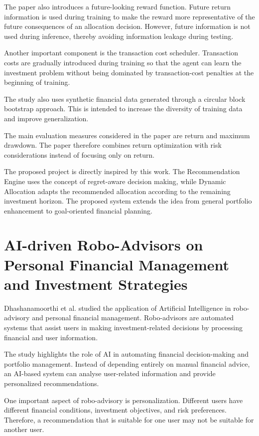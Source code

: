 The paper also introduces a future-looking reward function. Future return information is used during training to make the reward more representative of the future consequences of an allocation decision. However, future information is not used during inference, thereby avoiding information leakage during testing.

Another important component is the transaction cost scheduler. Transaction costs are gradually introduced during training so that the agent can learn the investment problem without being dominated by transaction-cost penalties at the beginning of training.

The study also uses synthetic financial data generated through a circular block bootstrap approach. This is intended to increase the diversity of training data and improve generalization.

The main evaluation measures considered in the paper are return and maximum drawdown. The paper therefore combines return optimization with risk considerations instead of focusing only on return.

The proposed project is directly inspired by this work. The Recommendation Engine uses the concept of regret-aware decision making, while Dynamic Allocation adapts the recommended allocation according to the remaining investment horizon. The proposed system extends the idea from general portfolio enhancement to goal-oriented financial planning.

\section{AI-driven Robo-Advisors on Personal Financial Management and Investment Strategies}
Dhashanamoorthi et al. studied the application of Artificial Intelligence in robo-advisory and personal financial management. Robo-advisors are automated systems that assist users in making investment-related decisions by processing financial and user information.

The study highlights the role of AI in automating financial decision-making and portfolio management. Instead of depending entirely on manual financial advice, an AI-based system can analyse user-related information and provide personalized recommendations.

One important aspect of robo-advisory is personalization. Different users have different financial conditions, investment objectives, and risk preferences. Therefore, a recommendation that is suitable for one user may not be suitable for another user.

